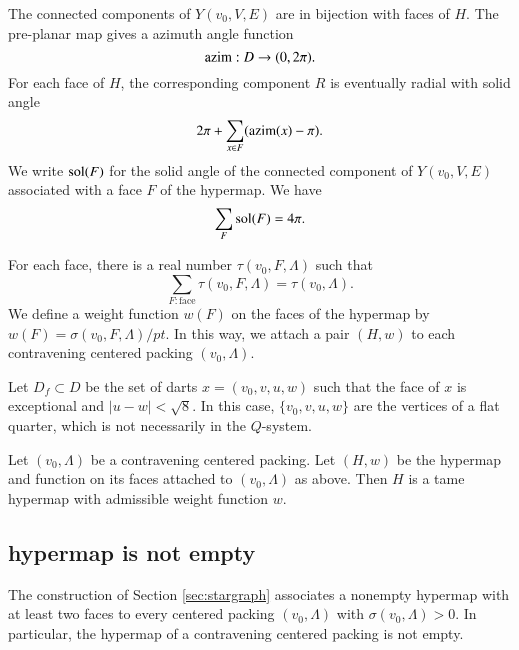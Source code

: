 The connected components of $Y(v_0,V,E)$ are in bijection with
faces of $H$.  
The pre-planar map gives a azimuth angle function
$$
{\operatorname{azim}} : D \to (0,2\pi).
$$
For each face of $H$, the corresponding component $R$
is eventually radial with solid
angle
  $$
  2\pi + \sum_{x\in F} ({\operatorname{azim}}(x) -\pi).
  $$
We write $\operatorname{sol}(F)$ for the solid angle of the connected component
of $Y(v_0,V,E)$ associated with a face $F$ of the hypermap.
We have
    $$\sum_{F} \operatorname{sol}(F) = 4\pi.$$


For each face, there is a
real number $\tau(v_0,F,\Lambda)$ such that
$$
  \sum_{F : \text{face}}\tau(v_0,F,\Lambda) = \tau(v_0,\Lambda).
$$
We define a weight function $w(F)$ on the faces of the hypermap
by $w(F) = \sigma(v_0,F,\Lambda)/pt$.  In this way, we attach
a pair $(H,w)$ to each contravening centered packing $(v_0,\Lambda)$.


Let $D_f\subset D$ be the set of darts 
   $x = (v_0,v,u,w)$
such that the face of $x$ is exceptional and $|u-w|<\sqrt8$.
In this case, $\{v_0,v,u,w\}$ are the vertices of a flat quarter,
which is not necessarily in the $Q$-system.

\begin{theorem} \label{theorem:contravene}
Let $(v_0,\Lambda)$ be a contravening centered packing.  Let $(H,w)$ be
the hypermap and function on its faces attached to $(v_0,\Lambda)$ as above.
Then $H$ is a tame hypermap with admissible weight function $w$.
\end{theorem}

\subsection{hypermap is not empty}




\begin{lemma}
\label{prop:nonempty} The construction of Section
\ref{sec:stargraph} associates a nonempty hypermap with at least
two faces to every centered packing $(v_0,\Lambda)$ with $\sigma(v_0,\Lambda)>0$.
In particular, the hypermap of a contravening centered packing is not empty.
\end{lemma}

